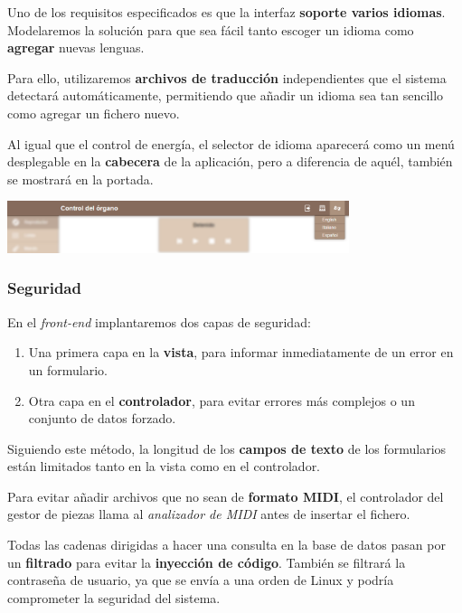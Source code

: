 \documentclass[10pt,a4paper]{article}
\begin{document}
	Uno de los requisitos especificados es que la interfaz \textbf{soporte varios idiomas}. Modelaremos la solución para que sea fácil tanto escoger un idioma como \textbf{agregar} nuevas lenguas.
	
	Para ello, utilizaremos \textbf{archivos de traducción} independientes que el sistema detectará automáticamente, permitiendo que añadir un idioma sea tan sencillo como agregar un fichero nuevo.
	
	Al igual que el control de energía, el selector de idioma aparecerá como un menú desplegable en la \textbf{cabecera} de la aplicación, pero a diferencia de aquél, también se mostrará en la portada.
	
	\begin{center}
		\includegraphics[width=0.75\textwidth]{images/cap_repr_idiomas} 
	\end{center}
	
	\subsubsection*{Seguridad}

	En el \textit{front-end} implantaremos dos capas de seguridad:
	
	\begin{enumerate}
		\item Una primera capa en la \textbf{vista}, para informar inmediatamente de un error en un formulario.
		\item Otra capa en el \textbf{controlador}, para evitar errores más complejos o un conjunto de datos forzado.
	\end{enumerate}
	
	Siguiendo este método, la longitud de los \textbf{campos de texto} de los formularios están limitados tanto en la vista como en el controlador.
	
	Para evitar añadir archivos que no sean de \textbf{formato MIDI}, el controlador del gestor de piezas llama al \textit{analizador de MIDI} antes de insertar el fichero.
	
	Todas las cadenas dirigidas a hacer una consulta en la base de datos pasan por un \textbf{filtrado} para evitar la \textbf{inyección de código}. También se filtrará la contraseña de usuario, ya que se envía a una orden de Linux y podría comprometer la seguridad del sistema.
	
\end{document}
